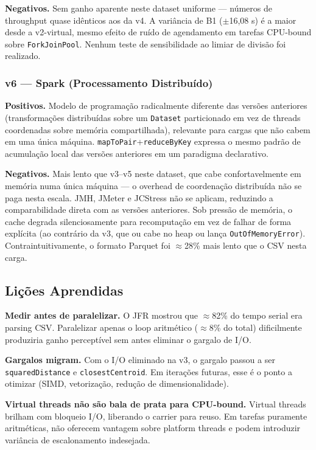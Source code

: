 \textbf{Negativos.}
Sem ganho aparente neste dataset uniforme --- números de throughput quase
idênticos aos da v4. A variância de B1 ($\pm$16{,}08 s) é a maior desde a
v2-virtual, mesmo efeito de ruído de agendamento em tarefas CPU-bound sobre
\texttt{ForkJoinPool}. Nenhum teste de sensibilidade ao limiar de divisão foi
realizado.

\subsubsection*{v6 --- Spark (Processamento Distribuído)}

\textbf{Positivos.}
Modelo de programação radicalmente diferente das versões anteriores
(transformações distribuídas sobre um \texttt{Dataset} particionado em vez de
threads coordenadas sobre memória compartilhada), relevante para cargas que
não cabem em uma única máquina. \texttt{mapToPair}+\texttt{reduceByKey}
expressa o mesmo padrão de acumulação local das versões anteriores em um
paradigma declarativo.

\textbf{Negativos.}
Mais lento que v3--v5 neste dataset, que cabe confortavelmente em memória numa
única máquina --- o overhead de coordenação distribuída não se paga nesta
escala. JMH, JMeter e JCStress não se aplicam, reduzindo a comparabilidade
direta com as versões anteriores. Sob pressão de memória, o cache degrada
silenciosamente para recomputação em vez de falhar de forma explícita (ao
contrário da v3, que ou cabe no heap ou lança \texttt{OutOfMemoryError}).
Contraintuitivamente, o formato Parquet foi $\approx$28\% mais lento que o CSV
nesta carga.

\subsection{Lições Aprendidas}

\textbf{Medir antes de paralelizar.}
O JFR mostrou que $\approx$82\% do tempo serial era parsing CSV. Paralelizar apenas o
loop aritmético ($\approx$8\% do total) dificilmente produziria ganho perceptível sem
antes eliminar o gargalo de I/O.

\textbf{Gargalos migram.}
Com o I/O eliminado na v3, o gargalo passou a ser \texttt{squaredDistance} e
\texttt{closestCentroid}. Em iterações futuras, esse é o ponto a otimizar
(SIMD, vetorização, redução de dimensionalidade).

\textbf{Virtual threads não são bala de prata para CPU-bound.}
Virtual threads brilham com bloqueio I/O, liberando o carrier para reuso.
Em tarefas puramente aritméticas, não oferecem vantagem sobre platform threads
e podem introduzir variância de escalonamento indesejada.

